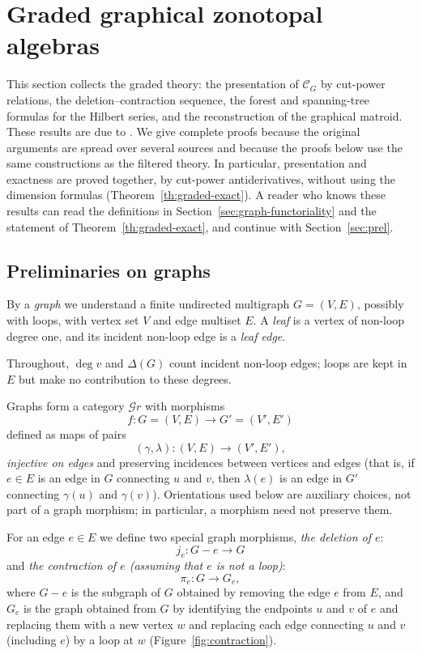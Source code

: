 \documentclass[reqno]{article}
\theoremstyle{plain} %
\theoremstyle{definition}
\theoremstyle{remark}
\newcommand {\CC}{\mathscr{C}}
\newcommand{\cG} {\mathscr{G}r}
\numberwithin{equation}{section}
\begin{document}
\section{Graded graphical zonotopal algebras}
\label{sec:graded}

This section collects the graded theory: the presentation of $\CC_G$ by
cut-power relations, the deletion--contraction sequence, the forest and
spanning-tree formulas for the Hilbert series, and the reconstruction of
the graphical matroid. These results are due to
\cite{PSS,PS,Wa1,HR,N1,Ne}. We give complete proofs because the original
arguments are spread over several sources and because the proofs below
use the same constructions as the filtered theory. In particular,
presentation and exactness are proved together, by cut-power
antiderivatives, without using the dimension formulas
(Theorem~\ref{th:graded-exact}). A reader who knows these results can
read the definitions in Section~\ref{sec:graph-functoriality} and the
statement of Theorem~\ref{th:graded-exact}, and continue with
Section~\ref{sec:prel}.

\subsection{Preliminaries on graphs}
By a \emph{graph} we understand a finite undirected multigraph $G=(V,E)$,
possibly with loops, with vertex set $V$ and edge multiset $E$.
A \emph{leaf} is a vertex of non-loop degree one, and its incident
non-loop edge is a \emph{leaf edge}.

Throughout, $\deg v$ and $\Delta(G)$ count incident non-loop edges; loops are kept in $E$ but make no contribution to these degrees.

Graphs form a category $\cG$ with morphisms
 \[f \colon G=(V,E) \to G'=(V',E') \]
 defined as
maps of pairs
\begin{equation}
  \label{eq:categ}
(\gamma,\lambda) \colon (V,E)\to (V',E'),
\end{equation}
\emph{injective on edges} and preserving incidences between vertices and edges (that is, if $e\in E$ is an edge in $G$ connecting $u$ and $v$, then $\lambda(e)$
is an edge  in $G'$ connecting $\gamma(u)$ and $\gamma(v)$).
Orientations used below are auxiliary choices, not part of a graph
morphism; in particular, a morphism need not preserve them.


For an edge $e\in E$ we define two special graph morphisms,
\emph{the deletion of $e$}:
\[  j_e\colon G-e\to G  \]
and \emph{the contraction of $e$ (assuming that $e$ is not a loop)}:
\[\pi_e\colon G\to G_e ,\]
where $G-e$ is the subgraph of $G$ obtained by removing the edge $e$ from $E$, and $G_e$ is the graph obtained from $G$ by identifying the endpoints $u$ and $v$ of $e$ and replacing them with a new vertex $w$ and replacing each edge connecting $u$ and $v$ (including $e$) by a loop at $w$ (Figure~\ref{fig:contraction}).
\end{document}
